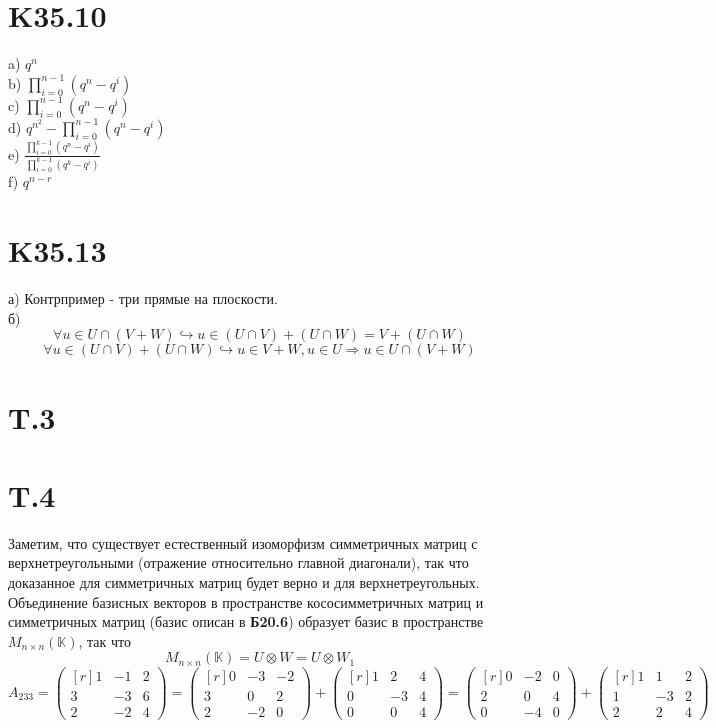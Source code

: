 \documentclass[a4paper,12pt]{article} %
\begin{document}
\section*{K35.10}
a) $q^{n}$\\
b) $\prod_{i=0}^{n-1}\left(q^{n}-q^{i}\right)$\\
c) $\prod_{i=0}^{n-1}\left(q^{n}-q^{i}\right)$\\
d) $q^{n^2}-\prod_{i=0}^{n-1}\left(q^{n}-q^{i}\right)$\\
e) $\frac{\prod_{i=0}^{k-1}\left(q^{n}-q^{i}\right)}{\prod_{i=0}^{k-1}\left(q^{k}-q^{i}\right)}$\\
f) $q^{n-r}$
\section*{K35.13}
а) Контрпример - три прямые на плоскости.\\
б) $$\forall u\in U\cap(V+W)\hookrightarrow u\in (U\cap V)+(U\cap W)=V+(U\cap W)$$
$$\forall u\in (U\cap V)+(U\cap W)\hookrightarrow u\in V+W, u\in U\Rightarrow u\in U\cap(V+W)$$
\section*{T.3}

\section*{T.4}
Заметим, что существует естественный изоморфизм симметричных матриц с верхнетреугольными (отражение относительно главной диагонали), так что доказанное для симметричных матриц будет верно и для верхнетреугольных.\\
Объединение базисных векторов в пространстве кососимметричных матриц и симметричных матриц (базис описан в \textbf{Б20.6}) образует базис в пространстве $M_{n\times n}(\mathbb{K})$, так что $$M_{n\times n}(\mathbb{K})=U\otimes W=U\otimes W_1$$
$$A_{233}=\begin{pmatrix*}[r]
    1&-1&2\\
    3&-3&6\\
    2&-2&4
\end{pmatrix*}=\begin{pmatrix*}[r]
    0&-3&-2\\
    3&0&2\\
    2&-2&0
\end{pmatrix*}+\begin{pmatrix*}[r]
    1&2&4\\
    0&-3&4\\
    0&0&4
\end{pmatrix*}=\begin{pmatrix*}[r]
    0&-2&0\\
    2&0&4\\
    0&-4&0
\end{pmatrix*}+\begin{pmatrix*}[r]
    1&1&2\\
    1&-3&2\\
    2&2&4
\end{pmatrix*}$$
\end{document}
